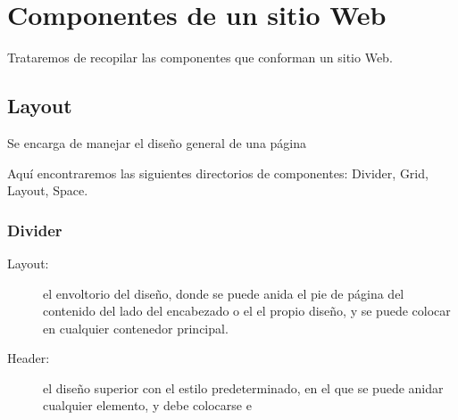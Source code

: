 \part{Componentes de un sitio Web}
Trataremos de recopilar las componentes que conforman un sitio Web.
\chapter{Layout}
Se encarga de manejar el dise\~no general de una p\'agina

Aqu\'i encontraremos las siguientes directorios de componentes: Divider, Grid, Layout, Space. 

\section{Divider}


\begin{description}
    \item[Layout: ] el envoltorio del dise\~no, donde se puede anida el pie de p\'agina del contenido del lado del encabezado o el 
                    el propio dise\~no, y se puede colocar en cualquier contenedor principal.
    \item[Header: ] el dise\~no superior con el estilo predeterminado, en el que se puede anidar cualquier elemento, y debe colocarse e
\end{description}